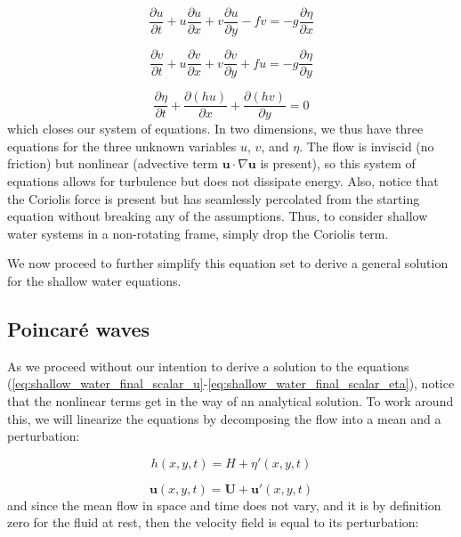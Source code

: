 \documentclass[12pt]{article}
\numberwithin{equation}{section}
\numberwithin{figure}{section}
\numberwithin{table}{section}
\begin{document}
\begin{equation}
  \frac{\partial u}{\partial t} +
  u \frac{\partial u}{\partial x} +
  v \frac{\partial u}{\partial y} -
  f v = 
  -g \frac{\partial \eta}{\partial x}
  \label{eq:shallow_water_final_scalar_u}
\end{equation}

\begin{equation}
  \frac{\partial v}{\partial t} +
  u \frac{\partial v}{\partial x} +
  v \frac{\partial v}{\partial y} +
  f u =
  -g \frac{\partial \eta}{\partial y}
  \label{eq:shallow_water_final_scalar_v}
\end{equation}

\begin{equation}
  \frac{\partial \eta}{\partial t} +
  \frac{\partial (hu)}{\partial x} +
  \frac{\partial (hv)}{\partial y} = 0
  \label{eq:shallow_water_final_scalar_eta}
\end{equation}
which closes our system of equations.
In two dimensions, we thus have three equations for the three unknown
variables $u$, $v$, and $\eta$.
The flow is inviscid (no friction) but nonlinear (advective term
$\mathbf{u} \cdot \nabla \mathbf{u}$ is present), so this system of equations
allows for turbulence but does not dissipate energy.
Also, notice that the Coriolis force is present but has seamlessly percolated
from the starting equation without breaking any of the assumptions.
Thus, to consider shallow water systems in a non-rotating frame, simply drop
the Coriolis term.

We now proceed to further simplify this equation set to derive a general
solution for the shallow water equations.

\subsection{Poincaré waves}
\label{sec:poincare_waves}

As we proceed without our intention to derive a solution to the
equations (\ref{eq:shallow_water_final_scalar_u}-\ref{eq:shallow_water_final_scalar_eta}),
notice that the nonlinear terms get in the way of an analytical solution.
To work around this, we will linearize the equations by decomposing the flow
into a mean and a perturbation:

\begin{equation}
  h(x, y, t) = H + \eta'(x, y, t)
\end{equation}

\begin{equation}
  \mathbf{u}(x, y, t) = \mathbf{U} + \mathbf{u}'(x, y, t)
\end{equation}
and since the mean flow in space and time does not vary, and it is by definition
zero for the fluid at rest, then the velocity field is equal to its perturbation:
\end{document}
